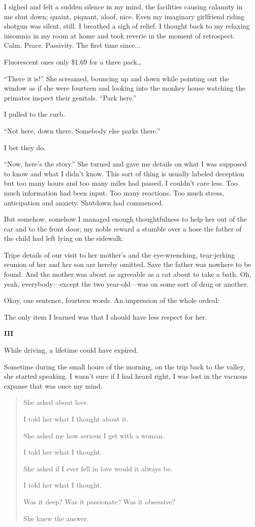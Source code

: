 I sighed and felt a sudden silence in my mind, the facilities causing
calamity in me shut down; quaint, piquant, aloof, nice. Even my
imaginary girlfriend riding shotgun was silent, still. I breathed a sigh
of relief. I thought back to my relaxing insomnia in my room at home and
took reverie in the moment of retrospect. Calm. Peace. Passivity. The
first time since...

Fluorescent ones only \$1.69 for a three pack\ldots{}

``There it is!'' She screamed, bouncing up and down while pointing out
the window as if she were fourteen and looking into the monkey house
watching the primates inspect their genitals. ``Park here.''

I pulled to the curb.

``Not here, down there. Somebody else parks there.''

I bet they do.

``Now, here's the story.'' She turned and gave me details on what I was
supposed to know and what I didn't know. This sort of thing is usually
labeled deception but too many hours and too many miles had passed, I
couldn't care less. Too much information had been input. Too many
reactions. Too much stress, anticipation and anxiety. Shutdown had
commenced.

But somehow, somehow I managed enough thoughtfulness to help her out of
the car and to the front door; my noble reward a stumble over a hose the
father of the child had left lying on the sidewalk.

Tripe details of our visit to her mother's and the eye-wrenching,
tear-jerking reunion of her and her son are hereby omitted. Save the
father was nowhere to be found. And the mother was about as agreeable as
a cat about to take a bath. Oh, yeah, everybody---except the two
year-old---was on some sort of drug or another.

Okay, one sentence, fourteen words. An impression of the whole ordeal:

The only item I learned was that I should have less respect for her.

\textbf{III}

While driving, a lifetime could have expired.

Sometime during the small hours of the morning, on the trip back to the
valley, she started speaking. I wasn't sure if I had heard right, I was
lost in the vacuous expanse that was once my mind.

\begin{quote}
She asked about love.

I told her what I thought about it.

She asked me how serious I get with a woman.

I told her what I thought.

She asked if I ever fell in love would it always be.

I told her what I thought.

Was it deep? Was it passionate? Was it obsessive?

She knew the answer.
\end{quote}

